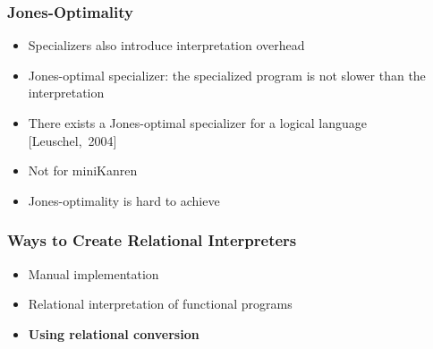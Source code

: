 \documentclass[xcolor=table]{beamer}
\begin{document}

\begin{frame}[fragile]
  \transwipe[direction=90]
  \frametitle{Jones-Optimality}
\begin{itemize}
	\item Specializers also introduce interpretation overhead
	\item Jones-optimal specializer: the specialized program is not slower than the interpretation
	\item There exists a Jones-optimal specializer for a logical language [Leuschel,~2004]
	\item Not for miniKanren
	\item Jones-optimality is hard to achieve
\end{itemize}
\end{frame}

\begin{frame}[fragile]
  \transwipe[direction=90]
  \frametitle{Ways to Create Relational Interpreters}
\begin{itemize}
	\item Manual implementation
	\item Relational interpretation of functional programs
	\item \textbf{Using relational conversion}
\end{itemize}
\end{frame}
\end{document}
